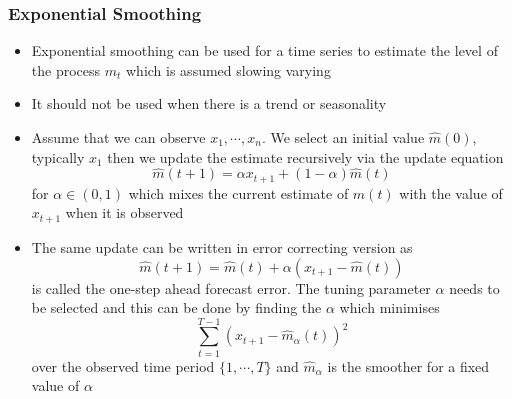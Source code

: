\documentclass[11pt]{article}
\begin{document}
\subsubsection{Exponential Smoothing}
\begin{itemize}
    \item Exponential smoothing can be used for a time series to estimate the level of the process $m_t$ which is assumed slowing varying 
    \item It should not be used when there is a trend or seasonality 
    \item Assume that we can observe $x_1,\cdots,x_n$. We select an initial value $\hat{m}(0)$, typically $x_1$ then we update the estimate recursively via the update equation \[\hat{m}(t+1) = \alpha x_{t+1} + (1-\alpha)\hat{m}(t)\] for $\alpha\in(0,1)$ which mixes the current estimate of $\hat{m}(t)$ with the value of $x_{t+1}$ when it is observed 
    \item The same update can be written in error correcting version as \[\hat{m}(t+1) = \hat{m}(t) + \alpha(x_{t+1} - \hat{m}(t))\] is called the one-step ahead forecast error. The tuning parameter $\alpha$ needs to be selected and this can be done by finding the $\alpha$ which minimises \[\sum_{t=1}^{T-1}(x_{t+1}-\hat{m}_\alpha(t))^2\] over the observed time period $\{1,\cdots,T\}$ and $\hat{m}_\alpha$ is the smoother for a fixed value of $\alpha$
\end{itemize}
\end{document}
